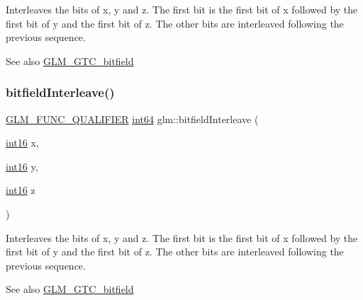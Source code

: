 Interleaves the bits of x, y and z. The first bit is the first bit of x followed by the first bit of y and the first bit of z. The other bits are interleaved following the previous sequence.

\begin{DoxySeeAlso}{See also}
\hyperlink{group__gtc__bitfield}{G\+L\+M\+\_\+\+G\+T\+C\+\_\+bitfield} 
\end{DoxySeeAlso}
\mbox{\label{group__gtc__bitfield_gaf898f842ac089fcc8d6201c32702584a}} 
\subsubsection{\texorpdfstring{bitfield\+Interleave()}{bitfieldInterleave()}\hspace{0.1cm}{\footnotesize\ttfamily [9/16]}}
{\footnotesize\ttfamily \hyperlink{setup_8hpp_a33fdea6f91c5f834105f7415e2a64407}{G\+L\+M\+\_\+\+F\+U\+N\+C\+\_\+\+Q\+U\+A\+L\+I\+F\+I\+ER} \hyperlink{group__gtc__type__precision_ga435d75819cce297cc5fa21bd84ef89a5}{int64} glm\+::bitfield\+Interleave (\begin{DoxyParamCaption}\item[{\hyperlink{group__gtc__type__precision_ga2945a61d12771f8954994fcddf02b021}{int16}}]{x,  }\item[{\hyperlink{group__gtc__type__precision_ga2945a61d12771f8954994fcddf02b021}{int16}}]{y,  }\item[{\hyperlink{group__gtc__type__precision_ga2945a61d12771f8954994fcddf02b021}{int16}}]{z }\end{DoxyParamCaption})}

Interleaves the bits of x, y and z. The first bit is the first bit of x followed by the first bit of y and the first bit of z. The other bits are interleaved following the previous sequence.

\begin{DoxySeeAlso}{See also}
\hyperlink{group__gtc__bitfield}{G\+L\+M\+\_\+\+G\+T\+C\+\_\+bitfield} 
\end{DoxySeeAlso}
\mbox{\label{group__gtc__bitfield_ga3c170e2ec54f2faab5e1c5bb693d718d}} 
